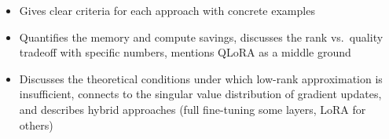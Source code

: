 \begin{interviewq}

\goodgreat
\begin{itemize}
    \item {} Gives clear criteria for each approach with concrete examples
    \item {} Quantifies the memory and compute savings, discusses the rank
          vs.\ quality tradeoff with specific numbers, mentions QLoRA as a middle ground
    \item {} Discusses the theoretical conditions under which low-rank
          approximation is insufficient, connects to the singular value distribution of
          gradient updates, and describes hybrid approaches (full fine-tuning some layers,
          LoRA for others)
\end{itemize}

\end{interviewq}

\bigskip

